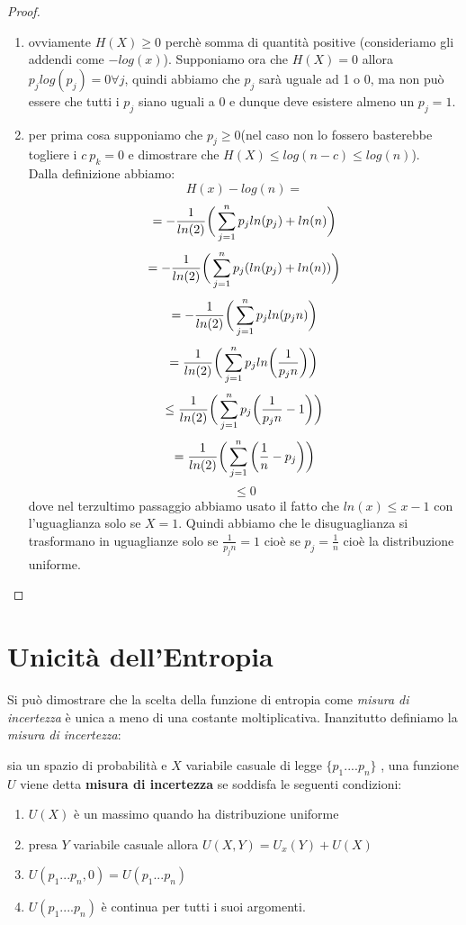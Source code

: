 \begin{proof}
\begin{enumerate}
\item ovviamente $H(X)\geq 0$ perchè somma di quantità positive (consideriamo gli addendi come $-log(x)$). Supponiamo ora che $H(X)=0$ allora $p_jlog(p_j)=0 \forall j$, quindi abbiamo che $p_j$ sarà uguale ad 1 o 0, ma non può essere che tutti i $p_j$ siano  uguali a 0 e dunque deve esistere almeno un $p_j=1$.
\item  per prima cosa supponiamo che $p_j\ge 0$(nel caso non lo fossero basterebbe togliere i $c \  p_k=0$ e dimostrare che $H(X)\leq log(n-c)\leq log(n)$).\\
Dalla definizione abbiamo:
$$H(x)-log(n)=$$
$$=-\frac{1}{ln(2)} \bigg( \sum_{j=1}^n p_j ln (p_j) + ln(n) \bigg)$$
$$=-\frac{1}{ln(2)} \bigg( \sum_{j=1}^n p_j (ln (p_j) + ln(n)) \bigg)$$
$$=-\frac{1}{ln(2)} \bigg( \sum_{j=1}^n p_j ln(p_jn)\bigg)$$
$$=\frac{1}{ln(2)} \bigg( \sum_{j=1}^n p_j ln \bigg( \frac{1}{p_jn} \bigg) \bigg)$$
$$\leq \frac{1}{ln(2)} \bigg( \sum_{j=1}^n p_j \bigg( \frac{1}{p_jn} -1 \bigg) \bigg)$$
$$= \frac{1}{ln(2)} \bigg( \sum_{j=1}^n \bigg( \frac{1}{n} -p_j \bigg) \bigg)$$
$$\leq 0$$
dove nel terzultimo passaggio abbiamo usato il fatto che $ln(x)\leq x-1$ con l'uguaglianza solo se $X=1$. Quindi abbiamo che le disuguaglianza si trasformano in uguaglianze solo se $\frac{1}{p_jn}=1$ cioè se $p_j=\frac{1}{n}$ cioè la distribuzione uniforme.
\end{enumerate}
\end{proof}


\section{Unicità dell'Entropia}
\label{sec:UniEntropia}
Si può dimostrare che la scelta della funzione di entropia come \textit{misura di incertezza} è unica a meno di una costante moltiplicativa. Inanzitutto definiamo la \textit{misura di incertezza}:
\begin{defi}
sia \spacep un spazio di probabilità e $X$ variabile casuale di legge $\{ p_1....p_n \}$ , una funzione $U$ viene detta \textbf{misura di incertezza} se soddisfa le seguenti condizioni:
\begin{enumerate}
\item $U(X)$ è un massimo quando ha distribuzione uniforme
\item presa $Y$ variabile casuale allora $U(X,Y)=U_x(Y)+U(X)$
\item $U(p_1...p_n,0)=U(p_1...p_n)$
\item $U(p_1....p_n)$ è continua per tutti i suoi argomenti.
\end{enumerate}
\end{defi}

